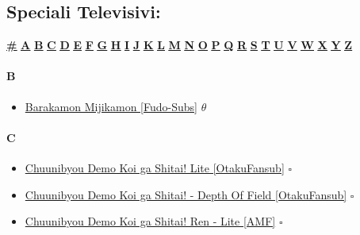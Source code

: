 	\subsection [Speciali Televisivi]{\huge Speciali Televisivi:}
	
		\begin{center}
			\hyperlink{SP\#}{\textbf{\underline{\#}}}
			\hyperlink{SPA}{\textbf{\underline{A}}} \hyperlink{SPB}{\textbf{\underline{B}}} \hyperlink{SPC}{\textbf{\underline{C}}} \hyperlink{SPD}{\textbf{\underline{D}}} \hyperlink{SPE}{\textbf{\underline{E}}} \hyperlink{SPF}{\textbf{\underline{F}}} \hyperlink{SPG}{\textbf{\underline{G}}} \hyperlink{SPH}{\textbf{\underline{H}}} \hyperlink{SPI}{\textbf{\underline{I}}} \hyperlink{SPJ}{\textbf{\underline{J}}} \hyperlink{SPK}{\textbf{\underline{K}}} \hyperlink{SPL}{\textbf{\underline{L}}} \hyperlink{SPM}{\textbf{\underline{M}}} \hyperlink{SPN}{\textbf{\underline{N}}} \hyperlink{SPO}{\textbf{\underline{O}}} \hyperlink{SPP}{\textbf{\underline{P}}} \hyperlink{SPQ}{\textbf{\underline{Q}}} \hyperlink{SPR}{\textbf{\underline{R}}} \hyperlink{SPS}{\textbf{\underline{S}}} \hyperlink{SPT}{\textbf{\underline{T}}} \hyperlink{SPU}{\textbf{\underline{U}}} \hyperlink{SPV}{\textbf{\underline{V}}} \hyperlink{SPW}{\textbf{\underline{W}}} \hyperlink{SPX}{\textbf{\underline{X}}} \hyperlink{SPY}{\textbf{\underline{Y}}} \hyperlink{SPZ}{\textbf{\underline{Z}}}
		\end{center}
		
		\paragraph{B} \hypertarget{SPB}{}
			\begin{itemize}
		
				\item  \href{https://mega.nz/#F!xkcVhJIA!UIuSaawLdFpTfPJE7BE9Hg} {Barakamon Mijikamon [Fudo-Subs]} $\theta$   \\ 
		
			\end{itemize}
		
		\paragraph{C} \hypertarget{SPC}{}
			\begin{itemize}
				
				\item  \href{https://mega.nz/#!PxVRmBII!OCaf4WHFNIwUICfJs_Z9KCbdyoJVAVn1u4kA3Wd2MdY} {Chuunibyou Demo Koi ga Shitai! Lite [OtakuFansub]} $\square$   \\ 
				\item  \href{https://mega.nz/#F!Osc1RIoB!qyBE1RXAzddnzakA6qfOMw} {Chuunibyou Demo Koi ga Shitai! - Depth Of Field [OtakuFansub]} $\square$   \\ 
				\item  \href{https://mega.nz/#F!T0UwwCYC!-KEcQno48gXFQUgkPPzbhw} {Chuunibyou Demo Koi ga Shitai! Ren - Lite [AMF]} $\square$   \\
				
			\end{itemize}
	
